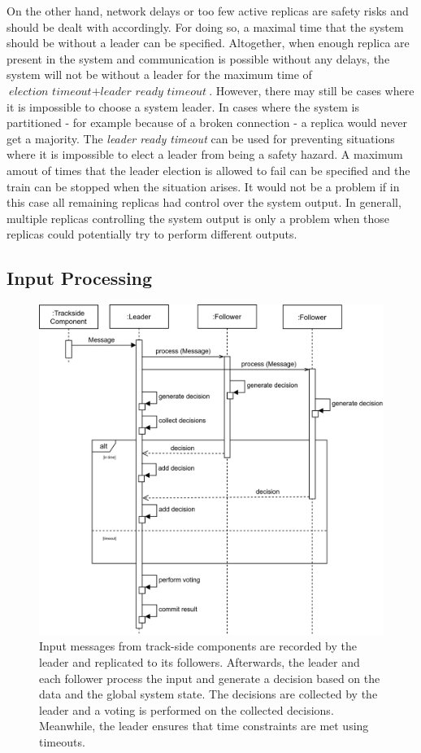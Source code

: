On the other hand, network delays or too few active replicas are safety risks and should be dealt with accordingly.
For doing so, a maximal time that the system should be without a leader can be specified.
Altogether, when enough replica are present in the system and communication is possible without any delays, the system will not be without a leader for the maximum time of $\textit{election timeout} + \textit{leader ready timeout}$.
However, there may still be cases where it is impossible to choose a system leader.
In cases where the system is partitioned - for example because of a broken connection - a replica would never get a majority.
The \textit{leader ready timeout} can be used for preventing situations where it is impossible to elect a leader from being a safety hazard.
A maximum amout of times that the leader election is allowed to fail can be specified and the train can be stopped when the situation arises.
It would not be a problem if in this case all remaining replicas had control over the system output.
In generall, multiple replicas controlling the system output is only a problem when those replicas could potentially try to perform different outputs.

\subsection{Input Processing}
\label{subsec:ImpInputProcessing}
\begin{figure}[!hb]
	\centering
	\includegraphics[width=0.75\linewidth]{images/sequence/CollectResults}
	\caption{Input messages from track-side components are recorded by the leader and replicated to its followers. Afterwards, the leader and each follower process the input and generate a decision based on the data and the global system state. The decisions are collected by the leader and a voting is performed on the collected decisions. Meanwhile, the leader ensures that time constraints are met using timeouts.}
	\label{fig:SeqCollectResults}
\end{figure}

